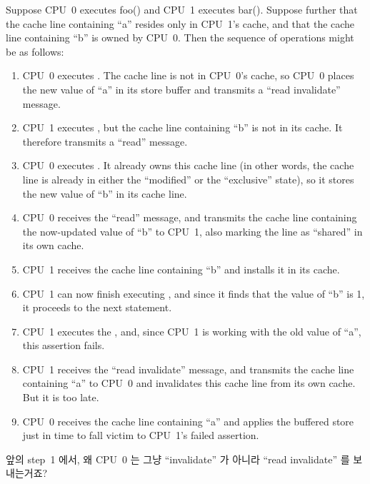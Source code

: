 Suppose CPU~0 executes foo() and CPU~1 executes bar().
Suppose further that the cache line containing ``a'' resides only in CPU~1's
cache, and that the cache line containing ``b'' is owned by CPU~0.
Then the sequence of operations might be as follows:
\begin{enumerate}
\item	CPU~0 executes .  The cache line is not in
	CPU~0's cache, so CPU~0 places the new value of ``a'' in its
	store buffer and transmits a ``read invalidate'' message.
\item	CPU~1 executes , but the cache line
	containing ``b'' is not in its cache.
	It therefore transmits a ``read'' message.
\item	CPU~0 executes .
	It already owns this cache line (in other words, the cache line
	is already in either the ``modified'' or the ``exclusive'' state),
	so it stores the new value of ``b'' in its cache line.
\item	CPU~0 receives the ``read'' message, and transmits the
	cache line containing the now-updated value of ``b''
	to CPU~1, also marking the line as ``shared'' in its own cache.
\item	CPU~1 receives the cache line containing ``b'' and installs
	it in its cache.
\item	CPU~1 can now finish executing ,
	and since it finds that the value of ``b'' is 1, it proceeds
	to the next statement.
\item	CPU~1 executes the , and, since CPU~1 is
	working with the old value of ``a'', this assertion fails.
\item	CPU~1 receives the ``read invalidate'' message, and
	transmits the cache line containing ``a'' to CPU~0 and
	invalidates this cache line from its own cache.
	But it is too late.
\item	CPU~0 receives the cache line containing ``a'' and applies
	the buffered store just in time to fall victim to CPU~1's
	failed assertion.
\end{enumerate}
\fi

\QuickQuiz{}
	앞의 step~1 에서, 왜 CPU~0 는 그냥 ``invalidate'' 가 아니라 ``read
	invalidate'' 를 보내는거죠?

\QuickQuizAnswer{
	해당 캐시 라인은 변수 \co{a} 외에도 많은 정보를 담고 있기 때문입니다.

} \QuickQuizEnd

